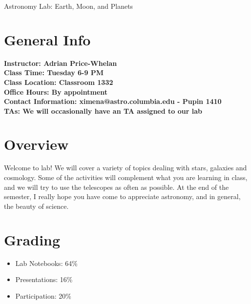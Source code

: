 \documentclass[11pt]{article}
\begin{document}
\begin{center}
{\Huge Astronomy Lab: Earth, Moon, and Planets}
\end{center}



\begin{flushleft}

\section*{General Info}
\bf Instructor: Adrian Price-Whelan \\
Class Time: Tuesday 6-9 PM \\
Class Location: Classroom 1332\\
Office Hours: By appointment\\
Contact Information: ximena@astro.columbia.edu - Pupin 1410\\
TAs: We will occasionally have an TA assigned to our lab \\


\section*{Overview}
Welcome to lab! We will cover a variety of topics dealing with stars, galaxies and cosmology.   Some of the activities will complement what you are learning in class, and we will try to use the telescopes as often as possible.  At the end of the semester, I really hope you have come to appreciate astronomy, and in general, the beauty of science.\\
\vspace{0.08in}


\section*{Grading}
\begin{itemize}
\item Lab Notebooks: 64\% \\
\item Presentations: 16\% \\
\item Participation: 20\% \\
\end{itemize}
\vspace{0.1in}


\end{flushleft}
\end{document}
